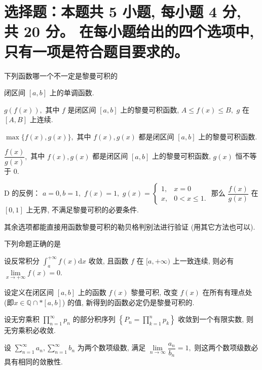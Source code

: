 \fi


\section{%
  选择题：本题共 5 小题, 每小题 4 分, 共 20 分。
  在每小题给出的四个选项中, 只有一项是符合题目要求的。
}


\begin{question}
  下列函数哪一个不一定是黎曼可积的 \paren[D]

  \begin{choices}
    \item 闭区间 $[a, b]$ 上的单调函数.
    \item $g(f(x)),$ 其中 $f$ 是闭区间 $[a, b]$ 上的黎曼可积函数, $A \leqslant f(x) \leqslant B,$ $g$ 在 $[A, B]$ 上连续.
    \item $\max\{f(x), g(x)\},$ 其中 $f(x), g(x)$ 都是闭区间 $[a, b]$ 上的黎曼可积函数.
    \item $\dfrac{f(x)}{g(x)},$ 其中 $f(x), g(x)$ 都是闭区间 $[a, b]$ 上的黎曼可积函数, $g(x)$ 恒不等于 $0.$
  \end{choices}
\end{question}

\begin{solution}
  D 的反例： $a = 0, b = 1,$ $f(x) = 1,$ $g(x) = \begin{cases}
    1, & x = 0 \\ x, & 0 < x \leqslant 1.
  \end{cases}$ 那么 $\dfrac{f(x)}{g(x)}$ 在 $[0, 1]$ 上无界, 不满足黎曼可积的必要条件.

  其余选项都能直接用函数黎曼可积的勒贝格判别法进行验证 (用其它方法也可以).
\end{solution}

\begin{question}
  下列命题正确的是 \paren[A]

  \begin{choices}
    \item 设反常积分 $\int_a^{+\infty} f(x) \mathrm{d} x$ 收敛, 且函数 $f$ 在 $[a, +\infty)$ 上一致连续, 则必有 $\lim\limits_{x \to +\infty} f(x) = 0.$
    \item 设定义在闭区间 $[a, b]$ 上的函数 $f(x)$ 黎曼可积, 改变 $f(x)$ 在所有有理点处 (即$x \in \mathbb{Q} \cap* [a, b]$) 的值, 新得到的函数必定仍是黎曼可积的.
    \item 设无穷乘积 $\prod\limits_{n=1}^{\infty} p_n$ 的部分积序列 $\left\{ P_n = \prod\limits_{k=1}^{n} p_k \right\}$ 收敛到一个有限实数, 则无穷乘积必收敛.
    \item 设 $\sum\limits_{n=1}^{\infty} a_n, \sum\limits_{n=1}^{\infty} b_n$ 为两个数项级数, 满足 $\lim\limits_{n\to\infty} \dfrac{a_n}{b_n} = 1,$ 则这两个数项级数必具有相同的敛散性.
  \end{choices}
\end{question}


